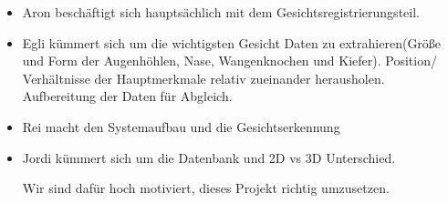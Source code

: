 \begin{itemize}
	
	\item Aron beschäftigt sich hauptsächlich mit dem Gesichtsregistrierungsteil. 
	\item Egli kümmert sich um die wichtigsten Gesicht Daten zu extrahieren(Größe und Form der Augenhöhlen, Nase, Wangenknochen und Kiefer). Position/ Verhältnisse der Hauptmerkmale relativ zueinander herausholen. Aufbereitung der Daten für Abgleich.
	\item Rei macht den Systemaufbau und die Gesichtserkennung
	\item Jordi k\"ummert sich um die Datenbank und 2D vs 3D Unterschied.
	
	Wir sind dafür hoch motiviert, dieses Projekt richtig umzusetzen.
	
\end{itemize}
